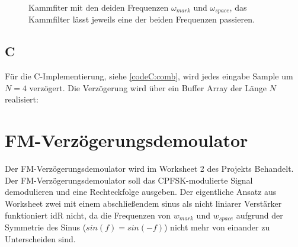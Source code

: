 \documentclass{article}
\begin{document}
\begin{figure}[!h]
    \label{fig:comb}
    \centering
    \def\svgscale{0.3}
    \def\svgwidth{0.8\columnwidth}
    \caption{Kammfiter mit den deiden Frequenzen $\omega_{mark}$ und $\omega_{space}$, das Kammfilter lässt jeweils eine der beiden Frequenzen passieren.}
\end{figure}
\subsection{C}
Für die C-Implementierung, siehe \ref{codeC:comb}, wird jedes eingabe Sample um $N = 4$ verzögert.
Die Verzögerung wird über ein Buffer Array der Länge $N$ realisiert:
% 
%
%
%            
%

\section{FM-Verzögerungsdemoulator} \label{sec:fm-demod}
Der FM-Verzögerungsdemoulator wird im Worksheet 2 des Projekts Behandelt. 
Der FM-Verzögerungsdemoulator soll das CPFSK-modulierte Signal demodulieren und eine Rechteckfolge ausgeben.
Der eigentliche Ansatz aus Worksheet zwei mit einem abschließendem sinus als nicht liniarer Verstärker funktioniert idR nicht, 
da die Frequenzen von $w_{mark}$ und $w_{space}$ aufgrund der Symmetrie des Sinus ($sin(f) = sin(-f)$) nicht mehr von einander zu Unterscheiden sind.
\end{document}
